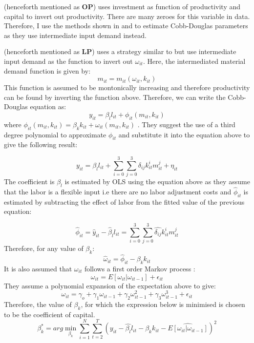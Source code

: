 \documentclass[12pt]{article}
\begin{document}
\textcite{olley1992dynamics} (henceforth mentioned as \textbf{OP}) uses investment
 as function of productivity and capital to invert out productivity.  There are many zeroes for this variable in data. Therefore, I use the  methods shown in \textcite{levinsohn2003estimating} and
\textcite{ackerberg2006structural} to estimate Cobb-Douglas
parameters as they use intermediate
input demand instead.  


\textcite{levinsohn2003estimating} (henceforth mentioned as \textbf{LP}) uses a  strategy
similar to \textcite{olley1992dynamics} but use intermediate input demand
as the function to invert out $\omega_{it}$. 
Here, the intermediated material demand function is given by:
$$  m_{it} = m_{it}(\omega_{it}, k_{it})$$
This function is assumed to be montonically increasing and therefore
productivity can be found by inverting the function above. Therefore,
we can write the Cobb-Douglas equation  as: 
$$ y_{it} = \beta_{l}l_{it} + \phi_{it}(m_{it},k_{it})$$
where $\phi_{it}(m_{it},k_{it}) =  \beta_{k}k_{it}+ \omega_{it}(m_{it}, k_{it})$
. They suggest the  use of a third degree polynomial to approximate 
$\phi_{it}$ and substitute it into the equation above to give the
following result: 

$$  y_{it} =  \beta_{l}l_{it} + \sum_{i=0}^{3} \sum_{j=0}^{3}
\delta_{ij}k_{it}^{i}m_{it}^{j} + \eta_{it}$$
The coefficient is $\beta_{l}$ is estimated by OLS using the equation
above as they assume that the labor is a flexible input i.e there are
no labor adjustment costs and $\hat{\phi}_{it}$ is estimated by
subtracting the effect of labor from
the fitted value of the previous equation:


$$ \hat{\phi}_{it} = \hat{y}_{it} - \hat{\beta}_{l}l_{it} =
 \sum_{i=0}^{3} \sum_{j=0}^{3}
\hat{\delta_{ij}}k_{it}^{i}m_{it}^{j}$$
Therefore,  for any value of $\beta_{k}$:
$$\hat{\omega}_{it} = \hat{\phi}_{it} - \beta_{k}k_{it}$$
 It is also assumed that $\omega_{it}$ follows a first order Markov
process : 
$$\omega_{it} = E[\omega_{it}|\omega_{it-1}] + \epsilon_{it}$$
They  assume a polynomial expansion of the expectation above to give:
$$ \omega_{it}=  \gamma_{o}+\gamma_{1}\omega_{it-1} +
\gamma_{2}\omega_{it-1}^2 + \gamma_{3}\omega_{it-1}^3 + \epsilon_{it} $$ 
Therefore, the value of $\beta_{k}$, for which the expression below is
minimised is chosen to be the coefficient of capital.  
\begin{equation}
\beta_{k}^{*} = arg \underset{\beta_{k}}{\min}\sum_{i=1}^{N}\sum_{t=2}^{T} (y_{it} - \hat{\beta_{l}}l_{it} -
\beta_{k}k_{it} - \hat{E[\omega_{it}|\omega_{it-1}]})^2 
\end{equation}
\end{document}
